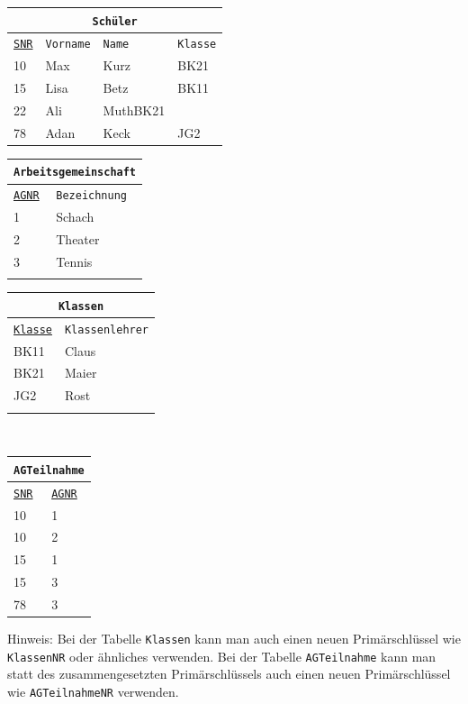 \documentclass[a4paper,12pt, headsepline, ngerman]{scrartcl}
\begin{document}
	\begin{Answer}[ref=KANormalisieren]

		\begin{tabular}{llll}
			\multicolumn{4}{c}{\lstinline!Schüler!}\\
			\hline
			\underline{\lstinline!SNR!}&\lstinline!Vorname!&\lstinline!Name!&\lstinline!Klasse!\\
			\hline
			10&Max&Kurz&BK21\\
			15&Lisa&Betz&BK11\\
			22&Ali&MuthBK21\\
			78&Adan&Keck&JG2\\
		\end{tabular}
		\begin{tabular}{ll}
			\multicolumn{2}{c}{\lstinline!Arbeitsgemeinschaft!}\\
			\hline
			\underline{\lstinline!AGNR!}&\lstinline!Bezeichnung!\\
			\hline
			1&Schach\\
			2&Theater\\
			3&Tennis\\
			\phantom{ }&\\
		\end{tabular}
		\begin{tabular}{ll}
			\multicolumn{2}{c}{\lstinline!Klassen!}\\
			\hline
			\underline{\lstinline!Klasse!}&\lstinline!Klassenlehrer!\\
			\hline
			BK11&Claus\\
			BK21&Maier\\
			JG2&Rost\\
			\phantom{ }&\\
		\end{tabular}\\
		\begin{tabular}{ll}
			\multicolumn{2}{c}{\lstinline!AGTeilnahme!}\\
			\hline
			\underline{\lstinline!SNR!}&\underline{\lstinline!AGNR!}\\
			\hline
			10&1\\
			10&2\\
			15&1\\
			15&3\\
			78&3\\
		\end{tabular}
		\begin{minipage}{0.8\textwidth}
			Hinweis: Bei der Tabelle \lstinline!Klassen! kann man auch einen neuen Primärschlüssel wie \lstinline!KlassenNR! oder ähnliches verwenden. Bei der Tabelle \lstinline!AGTeilnahme! kann man statt des zusammengesetzten Primärschlüssels auch einen neuen Primärschlüssel wie \lstinline!AGTeilnahmeNR! verwenden.
		\end{minipage}
	\end{Answer}%
\end{document}
